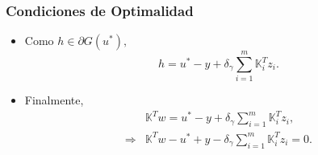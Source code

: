 \documentclass{beamer}
\begin{document}
\begin{frame}
    \frametitle{Condiciones de Optimalidad}
\begin{itemize}
    \item Como $h\in \partial G(u^*),$ 
    $$
    h=u^*-y+\delta_{\gamma}\displaystyle\sum_{i=1}^m \mathbb{K}_i^T z_i.
    $$
    \item Finalmente,
  \begin{align*}
     &\mathbb{K}^Tw=u^*-y+\delta_{\gamma}\sum_{i=1}^m \mathbb{K}_i^Tz_i,\\
     \Rightarrow &\mathbb{K}^Tw-u^*+y-\delta_{\gamma}\sum_{i=1}^m \mathbb{K}_i^Tz_i=0.
  \end{align*} 
\end{itemize}
\end{frame}
\justify
\end{document}
